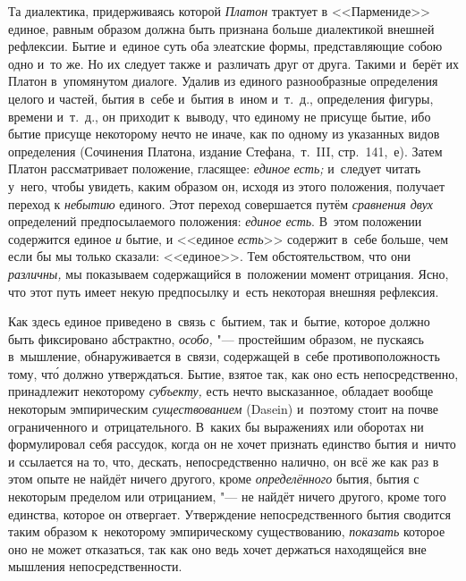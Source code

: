 Та диалектика, придерживаясь которой {\em Платон} трактует в <<Пармениде>>
единое, равным образом должна быть признана больше диалектикой внешней
рефлексии. Бытие и~единое суть оба элеатские формы, представляющие собою одно
и~то же. Но их следует также и~различать друг от друга. Такими и~берёт их
Платон в~упомянутом диалоге. Удалив из единого разнообразные определения целого
и частей, бытия в~себе и~бытия в~ином и~т.~д., определения фигуры, времени
и~т.~д., он приходит к~выводу, что единому не присуще бытие, ибо бытие присуще
некоторому нечто не иначе, как по одному из указанных видов определения
(Сочинения Платона, издание Стефана,~т.~III, стр.~141,~е). Затем Платон
рассматривает положение, гласящее: {\em единое} {\em есть;} и~следует читать
у~него, чтобы увидеть, каким образом он, исходя из этого положения, получает
переход к {\em небытию} единого. Этот переход совершается путём {\em сравнения
двух} определений предпосылаемого положения: {\em единое есть}. В~этом
положении содержится единое {\em и} бытие, и <<единое {\em есть}>> содержит в~себе
больше, чем если бы мы только сказали: <<единое>>. Тем обстоятельством, что они
{\em различны,} мы показываем содержащийся в~положении момент отрицания. Ясно, что
этот путь имеет некую предпосылку и~есть некоторая внешняя рефлексия.

Как здесь единое приведено в~связь с~бытием, так и~бытие, которое должно быть
фиксировано абстрактно, {\em особо,} "--- простейшим образом, не пускаясь
в~мышление, обнаруживается в~связи, содержащей в~себе противоположность тому,
чт\'{о} должно утверждаться. Бытие, взятое так, как оно есть непосредственно,
принадлежит некоторому {\em субъекту,} есть нечто высказанное, обладает вообще
некоторым эмпирическим {\em существованием} (Dasein) и~поэтому стоит на почве
ограниченного и~отрицательного. В~каких бы выражениях или оборотах ни
формулировал себя рассудок, когда он не хочет признать единство бытия и~ничто и
ссылается на то, что, дескать, непосредственно налично, он всё же как раз в
этом опыте не найдёт ничего другого, кроме {\em определённого} бытия, бытия с
некоторым пределом или отрицанием, "--- не найдёт ничего другого, кроме того
единства, которое он отвергает. Утверждение непосредственного бытия сводится
таким образом к~некоторому эмпирическому существованию, {\em показать} которое
оно не может отказаться, так как оно ведь хочет держаться находящейся вне
мышления непосредственности.

